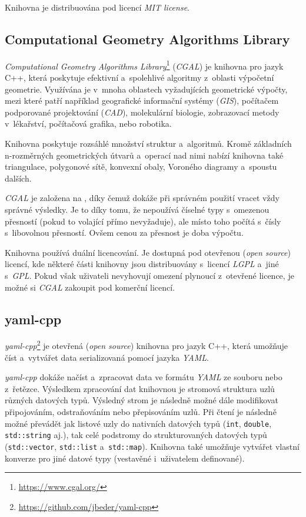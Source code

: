 Knihovna je distribuována pod licencí \emph{MIT license}.

\subsection*{Computational Geometry Algorithms Library}

\emph{Computational Geometry Algorithms Library}\footnote{\url{https://www.cgal.org/}} (\emph{CGAL}) je knihovna pro jazyk C++, která poskytuje efektivní a~spolehlivé algoritmy z~oblasti výpočetní geometrie. Využívána je v~mnoha oblastech vyžadujících geometrické výpočty, mezi které patří například geografické informační systémy (\emph{GIS}), počítačem podporované projektování (\emph{CAD}), molekulární biologie, zobrazovací metody v~lékařství, počítačová grafika, nebo robotika.

Knihovna poskytuje rozsáhlé množství struktur a~algoritmů. Kromě základních n-roz\-měr\-ných geometrických útvarů a~operací nad nimi nabízí knihovna také triangulace, polygonové sítě, konvexní obaly, Voroného diagramy a~spoustu dalších.

\emph{CGAL} je založena na , díky čemuž dokáže při správném použití vracet vždy správné výsledky. Je to díky tomu, že nepoužívá číselné typy s~omezenou přesností (pokud to volající přímo nevyžaduje), ale místo toho počítá s~čísly s~libovolnou přesností. Ovšem cenou za přesnost je doba výpočtu.

Knihovna používá duální licencování. Je dostupná pod otevřenou (\emph{open source}) licencí, kde některé části knihovny jsou distribuovány s~licencí \emph{LGPL} a~jiné s~\emph{GPL}. Pokud však uživateli nevyhovují omezení plynoucí z~otevřené licence, je možné si \emph{CGAL} zakoupit pod komerční licencí.

\subsection*{yaml-cpp}

\emph{yaml-cpp}\footnote{\url{https://github.com/jbeder/yaml-cpp}} je otevřená (\emph{open source}) knihovna pro jazyk C++, která umožňuje číst a~vytvářet data serializovaná pomocí jazyka \emph{YAML}.

\emph{yaml-cpp} dokáže načíst a~zpracovat data ve formátu \emph{YAML} ze souboru nebo z~řetězce. Výsledkem zpracování dat knihovnou je stromová struktura uzlů různých datových typů. Výsledný strom je následně možné dále modifikovat připojováním, odstraňováním nebo přepisováním uzlů. Při čtení je následně možné převádět jak listové uzly do nativních datových typů (\texttt{int}, \texttt{double}, \texttt{std::string} aj.), tak celé podstromy do strukturovaných datových typů (\texttt{std::vector}, \texttt{std::list} a~\texttt{std::map}). Knihovna také umožňuje vytvářet vlastní konverze pro jiné datové typy (vestavěné i~uživatelem definované).

